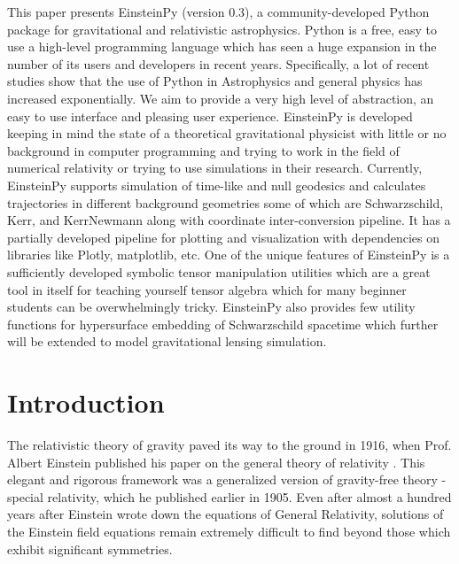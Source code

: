\documentclass[refree]{aa}
\begin{document}
   \date{Received May 04, 2020; accepted May 04, 2020}

 
  \abstract
{This paper presents EinsteinPy (version 0.3), a community-developed Python package for gravitational and relativistic astrophysics. Python is a free, easy to use a high-level programming language which has seen a huge expansion in the number of its users and developers in recent years. Specifically, a lot of recent studies show that the use of Python in Astrophysics and general physics has increased exponentially. We aim to provide a very high level of abstraction, an easy to use interface and pleasing user experience. EinsteinPy is developed keeping in mind the state of a theoretical gravitational physicist with little or no background in computer programming and trying to work in the field of numerical relativity or trying to use simulations in their research. Currently, EinsteinPy supports simulation of time-like and null geodesics and calculates trajectories in different background geometries some of which are Schwarzschild, Kerr, and KerrNewmann along with coordinate inter-conversion pipeline. It has a partially developed pipeline for plotting and visualization with dependencies on libraries like Plotly, matplotlib, etc. One of the unique features of EinsteinPy is a sufficiently developed symbolic tensor manipulation utilities which are a great tool in itself for teaching yourself tensor algebra which for many beginner students can be overwhelmingly tricky. EinsteinPy also provides few utility functions for hypersurface embedding of Schwarzschild spacetime which further will be extended to model gravitational lensing simulation.}


   \maketitle
%

\section{Introduction}

   The relativistic theory of gravity paved its way to the ground in 1916, 
   when Prof. Albert Einstein published his paper on the general theory of 
   relativity \citeyear{Einstein:1916vd}. This elegant and rigorous framework 
   was a generalized version of gravity-free theory - special relativity, 
   which he published earlier in 1905. Even after almost a hundred years 
   after Einstein wrote down the equations of General Relativity, solutions 
   of the Einstein field equations remain extremely difficult to find beyond 
   those which exhibit significant symmetries.
\end{document}

